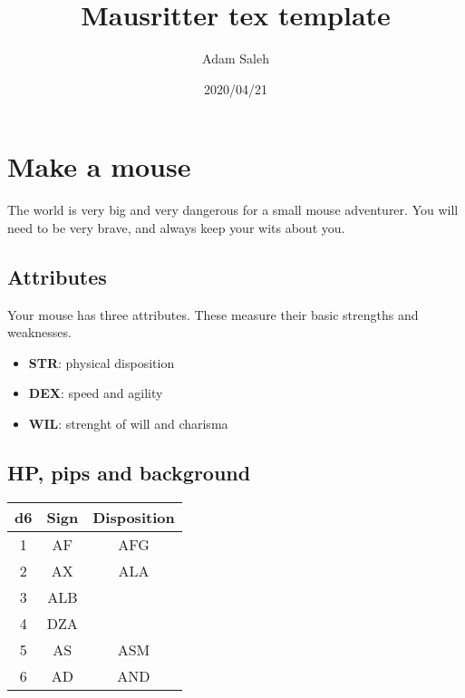 \documentclass[letterpaper,twocolumn,openany,nodeprecatedcode]{article}
\title{Mausritter tex template}
\author{Adam Saleh}
\date{2020/04/21}
\begin{document}
\section{Make a mouse}

The world is very big and very dangerous for a small
mouse adventurer. You will need to be very brave, and
always keep your wits about you.

\subsection{Attributes}

Your mouse has three attributes. These measure their
basic strengths and weaknesses.

\begin{itemize}
  \item \textbf{STR}: physical disposition
  \item \textbf{DEX}: speed and agility
  \item \textbf{WIL}: strenght of will and charisma
\end{itemize}

\subsection{HP, pips and background}

{
\begin{tabular}{ c c c  }
d6 & Sign & Disposition \\
\hline
1 & AF & AFG \\
2 & AX   & ALA \\
3 & ALB \\
4 & DZA \\
5 & AS & ASM \\
6 & AD & AND   \\
\end{tabular}
}

\end{document}
